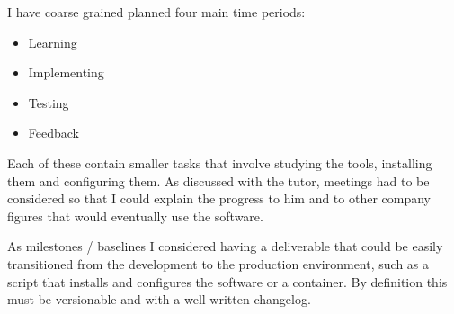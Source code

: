 	I have coarse grained planned four main time periods:
	\begin{itemize}
		\item Learning
		\item Implementing
		\item Testing
		\item Feedback
	\end{itemize}
	
	Each of these contain smaller tasks that involve studying the tools, installing them and configuring them.
	As discussed with the tutor, meetings had to be considered so that I could explain the progress to him and to other company figures that would eventually use the software.
	
	As milestones / baselines I considered having a deliverable that could be easily transitioned from the development to the production environment, such as a script that installs and configures the software or a container.
	By definition this must be versionable and with a well written changelog.
	
	